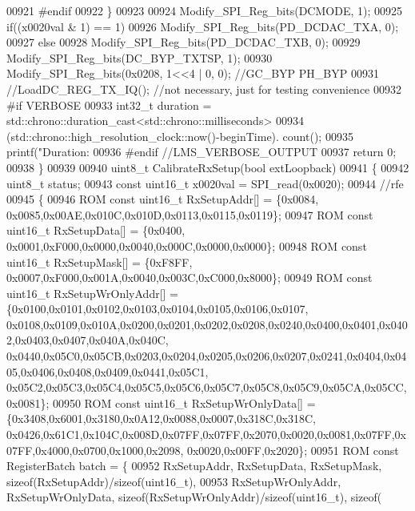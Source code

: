 \begin{DoxyCode}
{{{{{{{{{{{{{{{{{{{00921 \textcolor{preprocessor}{#endif}
00922     \}
00923 
00924     Modify_SPI_Reg_bits(DCMODE, 1);
00925     \textcolor{keywordflow}{if}((x0020val & 1) == 1)
00926         Modify_SPI_Reg_bits(PD_DCDAC_TXA, 0);
00927     \textcolor{keywordflow}{else}
00928         Modify_SPI_Reg_bits(PD_DCDAC_TXB, 0);
00929     Modify_SPI_Reg_bits(DC_BYP_TXTSP, 1);
00930     Modify_SPI_Reg_bits(0x0208, 1<<4 | 0, 0); \textcolor{comment}{//GC\_BYP PH\_BYP}
00931     \textcolor{comment}{//LoadDC\_REG\_TX\_IQ(); //not necessary, just for testing convenience}
00932 \textcolor{preprocessor}{#if VERBOSE}
00933     int32\_t duration = std::chrono::duration\_cast<std::chrono::milliseconds>
00934                        (std::chrono::high\_resolution\_clock::now()-beginTime).
      count();
00935     printf(\textcolor{stringliteral}{"Duration: %
00936 \textcolor{preprocessor}{#endif //LMS\_VERBOSE\_OUTPUT}
00937     \textcolor{keywordflow}{return} 0;
00938 \}
00939 
00940 uint8\_t CalibrateRxSetup(\textcolor{keywordtype}{bool} extLoopback)
00941 \{
00942     uint8\_t status;
00943     \textcolor{keyword}{const} uint16\_t x0020val = SPI_read(0x0020);
00944     \textcolor{comment}{//rfe}
00945     \{
00946         ROM \textcolor{keyword}{const} uint16\_t RxSetupAddr[] = \{0x0084, 0x0085,0x00AE,0x010C,0x010D,0x0113,0x0115,0x0119\};
00947         ROM \textcolor{keyword}{const} uint16\_t RxSetupData[] = \{0x0400, 0x0001,0xF000,0x0000,0x0040,0x000C,0x0000,0x0000\};
00948         ROM \textcolor{keyword}{const} uint16\_t RxSetupMask[] = \{0xF8FF, 0x0007,0xF000,0x001A,0x0040,0x003C,0xC000,0x8000\};
00949         ROM \textcolor{keyword}{const} uint16\_t RxSetupWrOnlyAddr[] = \{0x0100,0x0101,0x0102,0x0103,0x0104,0x0105,0x0106,0x0107,
      0x0108,0x0109,0x010A,0x0200,0x0201,0x0202,0x0208,0x0240,0x0400,0x0401,0x0402,0x0403,0x0407,0x040A,0x040C,
      0x0440,0x05C0,0x05CB,0x0203,0x0204,0x0205,0x0206,0x0207,0x0241,0x0404,0x0405,0x0406,0x0408,0x0409,0x0441,0x05C1,
      0x05C2,0x05C3,0x05C4,0x05C5,0x05C6,0x05C7,0x05C8,0x05C9,0x05CA,0x05CC, 0x0081\};
00950         ROM \textcolor{keyword}{const} uint16\_t RxSetupWrOnlyData[] = \{0x3408,0x6001,0x3180,0x0A12,0x0088,0x0007,0x318C,0x318C,
      0x0426,0x61C1,0x104C,0x008D,0x07FF,0x07FF,0x2070,0x0020,0x0081,0x07FF,0x07FF,0x4000,0x0700,0x1000,0x2098,
      0x0020,0x00FF,0x2020\};
00951         ROM \textcolor{keyword}{const} RegisterBatch batch = \{
00952             RxSetupAddr, RxSetupData, RxSetupMask, \textcolor{keyword}{sizeof}(RxSetupAddr)/\textcolor{keyword}{sizeof}(uint16\_t),
00953             RxSetupWrOnlyAddr, RxSetupWrOnlyData, \textcolor{keyword}{sizeof}(RxSetupWrOnlyAddr)/\textcolor{keyword}{sizeof}(uint16\_t), \textcolor{keyword}{sizeof}(
}}}}}}}}}}}}}}}}}}}}
\end{DoxyCode}
